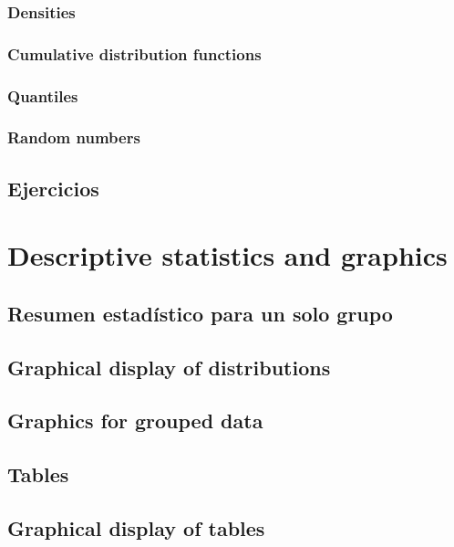 \documentclass[spanish]{extbook}
\numberwithin{equation}{section}
\numberwithin{figure}{section}
\begin{document}
\subsection{Densities}
\subsection{Cumulative distribution functions}
\subsection{Quantiles}
\subsection{Random numbers}
\section{Ejercicios}

\chapter{Descriptive statistics and graphics}
\section{Resumen estadístico para un solo grupo} \label{resestad}
\section{Graphical display of distributions}
\section{Graphics for grouped data}
\section{Tables} \label{tables}
\section{Graphical display of tables}
\end{document}
